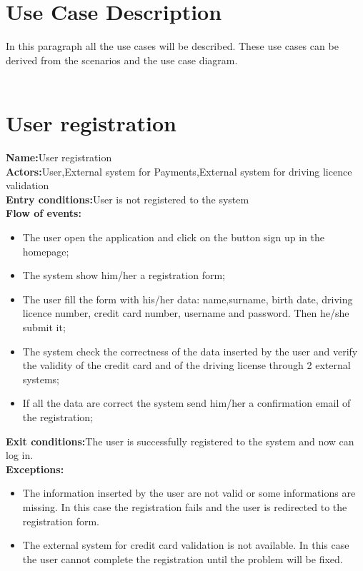 \section{Use Case Description}
In this paragraph all the use cases will be described. These use cases can be derived from the scenarios and the use case diagram.\\
\\
\section*{User registration} 
\textbf{Name:}User registration \\
\textbf{Actors:}User,External system for Payments,External system for driving licence validation\\
\textbf{Entry conditions:}User is not registered to the system \\
\textbf{Flow of events:} \\
\begin{itemize}
\item The user open the application and click on the button sign up in the homepage;
\item The system show him/her a registration form;
\item The user fill the form with his/her data: name,surname, birth date, driving licence number, credit card number, username and password. Then he/she submit it;
\item The system check the correctness of the data inserted by the user and verify the validity of the credit card and of the driving license through 2 external systems;
\item If all the data are correct the system send him/her a confirmation email of the registration;
\end{itemize}
\textbf{Exit conditions:}The user is successfully registered to the system and now can log in.\\
\textbf{Exceptions:}
\begin{itemize}
\item The information inserted by the user are not valid or some informations are missing.
In this case the registration fails and the user is redirected to the registration form.
\item The external system for credit card validation is not available. In this case the user cannot complete the registration until the problem will be fixed.
\end{itemize}


